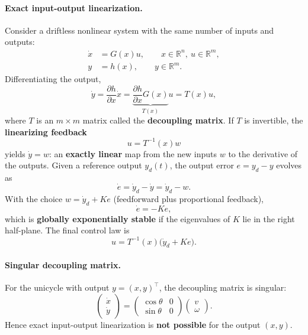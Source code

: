 \paragraph{Exact input-output linearization.}
Consider a driftless nonlinear system with the same number of inputs
and outputs:
\begin{align}
    \dot{x} &= G(x) u, \qquad x \in \mathbb{R}^n,\ u \in \mathbb{R}^m,
    \\
    y &= h(x), \qquad y \in \mathbb{R}^m.
\end{align}
Differentiating the output,
\[
\dot{y} = \frac{\partial h}{\partial x} \dot{x}
        = \underbrace{\frac{\partial h}{\partial x} G(x)}_{T(x)} u
        = T(x) u,
\]
where \( T \) is an \( m \times m \) matrix called the
\textbf{decoupling matrix}. If \( T \) is invertible, the
\textbf{linearizing feedback}
\[
u = T^{-1}(x) w
\]
yields \( \dot{y} = w \): an \textbf{exactly linear} map from the new
inputs \( w \) to the derivative of the outputs. Given a reference
output \( y_d(t) \), the output error \( e = y_d - y \) evolves as
\[
\dot{e} = \dot{y}_d - \dot{y} = \dot{y}_d - w.
\]
With the choice \( w = \dot{y}_d + K e \) (feedforward plus
proportional feedback),
\[
\dot{e} = -K e,
\]
which is \textbf{globally exponentially stable} if the eigenvalues of
\( K \) lie in the right half-plane. The final control law is
\[
u = T^{-1}(x) \big( \dot{y}_d + K e \big).
\]

\paragraph{Singular decoupling matrix.}
For the unicycle with output \( y = (x, y)^\top \), the decoupling
matrix is singular:
\[
\begin{pmatrix} \dot{x} \\ \dot{y} \end{pmatrix}
=
\begin{pmatrix}
    \cos\theta & 0 \\
    \sin\theta & 0
\end{pmatrix}
\begin{pmatrix} v \\ \omega \end{pmatrix}.
\]
Hence exact input-output linearization is \textbf{not possible} for
the output \( (x, y) \).

